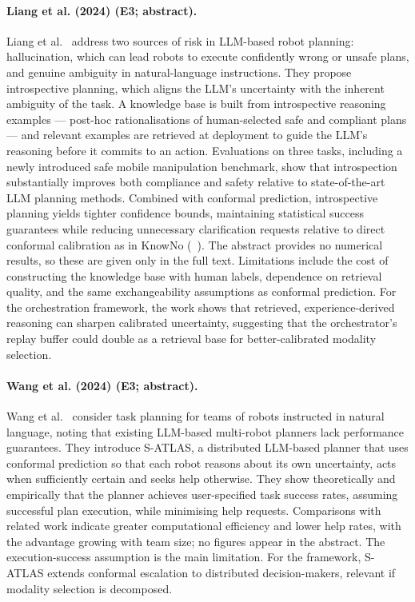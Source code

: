 \documentclass[10pt,a4paper]{article}
\begin{document}
\paragraph{Liang et al. (2024) (E3; abstract).} Liang et al.~\cite{Liang2024} address two sources of risk in LLM-based robot planning: hallucination, which can lead robots to execute confidently wrong or unsafe plans, and genuine ambiguity in natural-language instructions. They propose introspective planning, which aligns the LLM's uncertainty with the inherent ambiguity of the task. A knowledge base is built from introspective reasoning examples --- post-hoc rationalisations of human-selected safe and compliant plans --- and relevant examples are retrieved at deployment to guide the LLM's reasoning before it commits to an action. Evaluations on three tasks, including a newly introduced safe mobile manipulation benchmark, show that introspection substantially improves both compliance and safety relative to state-of-the-art LLM planning methods. Combined with conformal prediction, introspective planning yields tighter confidence bounds, maintaining statistical success guarantees while reducing unnecessary clarification requests relative to direct conformal calibration as in KnowNo (~\cite{Ren2023}). The abstract provides no numerical results, so these are given only in the full text. Limitations include the cost of constructing the knowledge base with human labels, dependence on retrieval quality, and the same exchangeability assumptions as conformal prediction. For the orchestration framework, the work shows that retrieved, experience-derived reasoning can sharpen calibrated uncertainty, suggesting that the orchestrator's replay buffer could double as a retrieval base for better-calibrated modality selection.

\paragraph{Wang et al. (2024) (E3; abstract).} Wang et al.~\cite{Wang2024c} consider task planning for teams of robots instructed in natural language, noting that existing LLM-based multi-robot planners lack performance guarantees. They introduce S-ATLAS, a distributed LLM-based planner that uses conformal prediction so that each robot reasons about its own uncertainty, acts when sufficiently certain and seeks help otherwise. They show theoretically and empirically that the planner achieves user-specified task success rates, assuming successful plan execution, while minimising help requests. Comparisons with related work indicate greater computational efficiency and lower help rates, with the advantage growing with team size; no figures appear in the abstract. The execution-success assumption is the main limitation. For the framework, S-ATLAS extends conformal escalation to distributed decision-makers, relevant if modality selection is decomposed.
\end{document}
